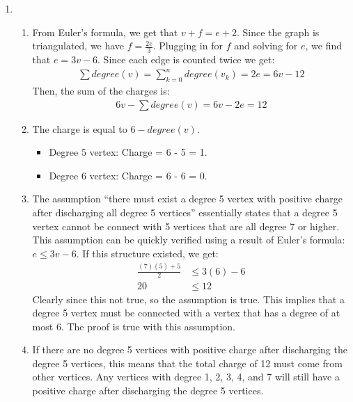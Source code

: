 \documentclass[a4paper]{article}
\newcommand{\<}{\langle}
\renewcommand{\>}{\rangle}
\renewcommand{\^}{\wedge}
\begin{document}
\begin{enumerate}
    \item 
        \begin{enumerate}
            \item 
            From Euler's formula, we get that $v + f = e + 2$. Since the graph is triangulated, we have $f = \frac{2e}{3}$. Plugging in for $f$ and solving for $e$, we find that $e = 3v - 6$. Since each edge is counted twice we get:
                \begin{align*}
                    \sum{degree(v)} = \sum_{k = 0}^{n}{degree(v_k)} = 2e = 6v - 12
                \end{align*}
            Then, the sum of the charges is:
                \begin{align*}
                    6v - \sum{degree(v)} = 6v - 2e = 12
                \end{align*}
            
            \item
            The charge is equal to $6 - degree(v)$.
                \begin{itemize}
                    \item Degree 5 vertex: Charge = 6 - 5 = 1.
                    \item Degree 6 vertex: Charge = 6 - 6 = 0.
                \end{itemize}
            
            \item 
            The assumption ``there must exist a degree 5 vertex with positive charge after discharging all degree 5 vertices'' essentially states that a degree 5 vertex cannot be connect with 5 vertices that are all degree 7 or higher. This assumption can be quickly verified using a result of Euler's formula: $e \leq 3v - 6$. If this structure existed, we get:
            \begin{align*}
                \frac{(7)(5) + 5}{2} &\leq 3(6) - 6\\
                20 &\leq 12
            \end{align*}
            Clearly since this not true, so the assumption is true. This implies that a degree 5 vertex must be connected with a vertex that has a degree of at most 6. The proof is true with this assumption.
            
            \item If there are no degree 5 vertices with positive charge after discharging the degree 5 vertices, this means that the total charge of 12 must come from other vertices. Any vertices with degree 1, 2, 3, 4, and 7 will still have a positive charge after discharging the degree 5 vertices.
            

\end{enumerate}
\end{enumerate}
\end{document}

